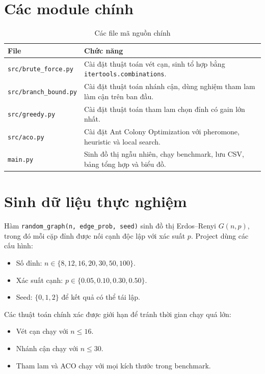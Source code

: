 \documentclass[12pt, a4paper]{report}
\begin{document}
\section{Các module chính}

\begin{table}[H]
  \centering
  \caption{Các file mã nguồn chính}
  \begin{tabular}{p{4cm} p{8cm}}
    \toprule
    \textbf{File} & \textbf{Chức năng} \\
    \midrule
    \texttt{src/brute\_force.py} & Cài đặt thuật toán vét cạn, sinh tổ hợp bằng \texttt{itertools.combinations}. \\
    \texttt{src/branch\_bound.py} & Cài đặt thuật toán nhánh cận, dùng nghiệm tham lam làm cận trên ban đầu. \\
    \texttt{src/greedy.py} & Cài đặt thuật toán tham lam chọn đỉnh có gain lớn nhất. \\
    \texttt{src/aco.py} & Cài đặt Ant Colony Optimization với pheromone, heuristic và local search. \\
    \texttt{main.py} & Sinh đồ thị ngẫu nhiên, chạy benchmark, lưu CSV, bảng tổng hợp và biểu đồ. \\
    \bottomrule
  \end{tabular}
\end{table}

\section{Sinh dữ liệu thực nghiệm}

Hàm \texttt{random\_graph(n, edge\_prob, seed)} sinh đồ thị Erdos--Renyi $G(n,p)$, trong đó mỗi cặp đỉnh
được nối cạnh độc lập với xác suất $p$. Project dùng các cấu hình:

\begin{itemize}
  \item Số đỉnh: $n \in \{8,12,16,20,30,50,100\}$.
  \item Xác suất cạnh: $p \in \{0.05,0.10,0.30,0.50\}$.
  \item Seed: $\{0,1,2\}$ để kết quả có thể tái lập.
\end{itemize}

Các thuật toán chính xác được giới hạn để tránh thời gian chạy quá lớn:

\begin{itemize}
  \item Vét cạn chạy với $n \leq 16$.
  \item Nhánh cận chạy với $n \leq 30$.
  \item Tham lam và ACO chạy với mọi kích thước trong benchmark.
\end{itemize}
\end{document}
